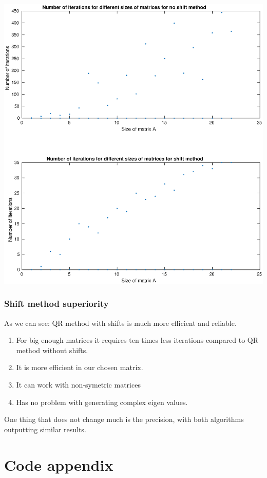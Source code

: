 \documentclass[12pt]{report}
\begin{document}
\begin{center}
   \includegraphics[scale=0.5]{task4plot.eps}
\end{center}
\newpage
\subsection{Shift method superiority}
As we can see:
QR method with shifts is much more efficient and reliable.
\begin{enumerate}
\item For big enough matrices it requires ten times less iterations compared to QR method without shifts.
\item It is more efficient in our chosen matrix.
\item It can work with non-symetric matrices
\item Has no problem with generating complex eigen values.
\end{enumerate}
 One thing that does not change much is the precision, with both algorithms outputting similar results.






\chapter{Code appendix}
\end{document}
